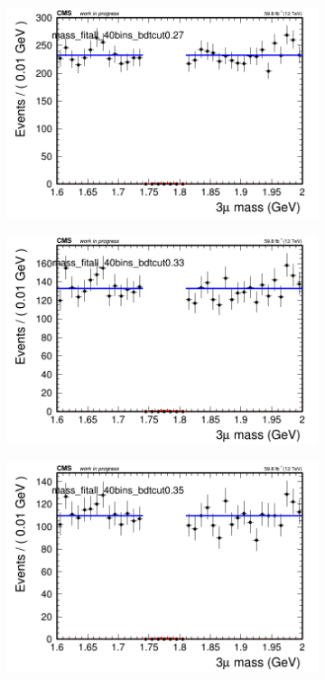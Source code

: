 \begin{figure}[H]
\begin{subfigure}{0.2\textwidth}
        \caption{}
    \end{subfigure}
    \begin{subfigure}{0.2\textwidth}
        \includegraphics[width=\textwidth]{flat_fit/plots/all/massfit_all_40bins_bdtcut0.27.png}
        \caption{}
    \end{subfigure}
    \begin{subfigure}{0.2\textwidth}
        \includegraphics[width=\textwidth]{flat_fit/plots/all/massfit_all_40bins_bdtcut0.33.png}
        \caption{}
    \end{subfigure}
    \begin{subfigure}{0.2\textwidth}
        \includegraphics[width=\textwidth]{flat_fit/plots/all/massfit_all_40bins_bdtcut0.35.png}

\end{subfigure}
\end{figure}
